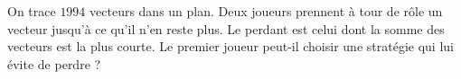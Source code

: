 On trace $1994$ vecteurs dans un plan. Deux joueurs prennent à tour de rôle un vecteur jusqu'à ce qu'il n'en reste plus. Le perdant est celui dont la somme des vecteurs est la plus courte. Le premier joueur peut-il choisir une stratégie qui lui évite de perdre ?
